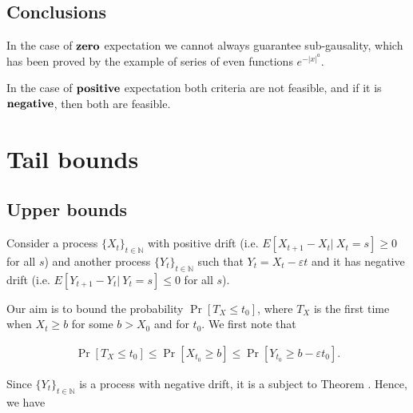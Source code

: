 \documentclass[12pt, a4paper]{article}
\theoremstyle{remark}
\newcommand{\expx}[1]{e^{-|x|^{#1}}}
\begin{document}
\begin{figure}[h!]
\begin{center}
    \end{center}
\end{figure}

\subsection*{Conclusions}

In the case of $\textbf{\text{zero}}$ expectation we cannot always guarantee sub-gausality, which has been proved by the example of series of even functions $\expx{a}$.

In the case of $\textbf{\text{positive}}$ expectation both criteria are not feasible, and if it is $\textbf{\text{negative}}$, then both are feasible.

\section{Tail bounds}
\subsection{Upper bounds}
Consider a process $\{X_t\}_{t \in \mathbb{N}}$ with positive drift (i.e. $E[X_{t + 1} - X_t |\ X_t = s] \geq 0$ for all $s$) and another process $\{Y_t\}_{t \in \mathbb{N}}$ such that $Y_t = X_t - \varepsilon t$ and it has negative drift (i.e. $E[Y_{t + 1} - Y_t |\ Y_t = s] \leq 0$ for all $s$).

Our aim is to bound the probability $\Pr[T_X \leq t_0]$, where $T_X$ is the first time when $X_t \geq b$ for some $b > X_0$ and for $t_0$. We first note that

\begin{align*}
    \Pr[T_X \leq t_0] \leq \Pr[X_{t_0} \geq b] \leq \Pr[Y_{t_0} \geq b - \varepsilon t_0].
\end{align*}

Since $\{Y_t\}_{t \in \mathbb{N}}$ is a process with negative drift, it is a subject to Theorem \cite{}. Hence, we have
\end{document}
